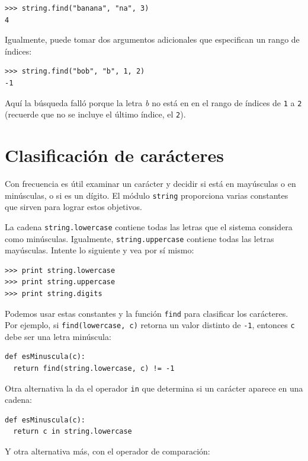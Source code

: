 \beforeverb
\begin{verbatim}
>>> string.find("banana", "na", 3)
4
\end{verbatim}
\afterverb
%
Igualmente, puede tomar dos argumentos adicionales que especifican
un rango de índices:

\beforeverb
\begin{verbatim}
>>> string.find("bob", "b", 1, 2)
-1
\end{verbatim}
\afterverb
%
Aquí la búsqueda falló porque la letra {\em b} no está en
en el rango de índices de \texttt{1} a \texttt{2} (recuerde que no 
se incluye el último índice, el \texttt{2}).


\section{Clasificación de carácteres }
\label{in}

Con frecuencia es útil examinar un carácter y decidir si está
en mayúsculas o en minúsculas, o si es un dígito. El módulo 
\texttt{string} proporciona varias constantes que sirven para
lograr estos objetivos.

La cadena \texttt{string.lowercase} contiene todas las letras que
el sistema considera como minúsculas. Igualmente,  \texttt{string.uppercase}
contiene todas las letras mayúsculas. Intente lo siguiente y vea por
sí mismo:

\beforeverb
\begin{verbatim}
>>> print string.lowercase
>>> print string.uppercase
>>> print string.digits
\end{verbatim}
\afterverb
%
Podemos usar estas constantes y la función  \texttt{find} para clasificar
los carácteres. Por ejemplo, si  \texttt{find(lowercase, c)} retorna un 
valor distinto de \texttt{-1}, entonces \texttt{c} debe ser una letra minúscula:

\beforeverb
\begin{verbatim}
def esMinuscula(c):
  return find(string.lowercase, c) != -1
\end{verbatim}
\afterverb
%
Otra alternativa la da el operador  \texttt{in} que determina si un carácter 
aparece en una cadena:

\beforeverb
\begin{verbatim}
def esMinuscula(c):
  return c in string.lowercase
\end{verbatim}
\afterverb
%
Y otra alternativa más, con el operador de comparación:

